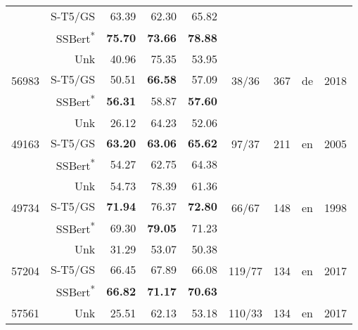 \documentclass[11pt]{article}
\begin{document}
\begin{table*}[]
\begin{tabular}{l|r|r|r|r|c|c|c|c}
     &    S-T5/GS & 63.39 & 62.30 & 65.82 &        &     &                   &   \\
     &    SSBert\textsuperscript{*} & \textbf{75.70} & \textbf{73.66} & \textbf{78.88}        &     &         &           &   \\
    \hline
    \multirow{3}{3em}{56983} &    Unk & 40.96 & 75.35 & 53.95 &       \multirow{3}{4em}{38/36} &    \multirow{3}{1em}{367} &        \multirow{3}{1em}{de} &            \multirow{3}{2em}{2018} \\
     &    S-T5/GS & 50.51 & \textbf{66.58} & 57.09 &        &     &         &             \\
     &    SSBert\textsuperscript{*} & \textbf{56.31} & 58.87 & \textbf{57.60} &        &     &         &             \\
    \hline
    \multirow{3}{3em}{49163} &    Unk & 26.12 & 64.23 & 52.06 &      \multirow{3}{4em}{97/37} &    \multirow{3}{1em}{211} &        \multirow{3}{1em}{en} &            \multirow{3}{2em}{2005} \\
     &    S-T5/GS & \textbf{63.20} & \textbf{63.06} & \textbf{65.62} &       &     &         &             \\
     &    SSBert\textsuperscript{*} & 54.27 & 62.75 & 64.38 &       &     &         &             \\
    \hline
    \multirow{3}{3em}{49734} &    Unk & 54.73 & 78.39 & 61.36 &      \multirow{3}{4em}{66/67} &    \multirow{3}{1em}{148} &        \multirow{3}{1em}{en} &            \multirow{3}{2em}{1998} \\
     &    S-T5/GS & \textbf{71.94} & 76.37 & \textbf{72.80} &       &     &         &             \\
     &    SSBert\textsuperscript{*} & 69.30 & \textbf{79.05} & 71.23 &       &     &         &             \\
    \hline
    \multirow{3}{3em}{57204} &    Unk & 31.29 & 53.07 & 50.38 &      \multirow{3}{4em}{119/77} &    \multirow{3}{1em}{134} &        \multirow{3}{1em}{en} &           \multirow{3}{2em}{2017} \\
     &    S-T5/GS & 66.45 & 67.89 & 66.08 &       &     &         &             \\
     &    SSBert\textsuperscript{*} & \textbf{66.82} & \textbf{71.17} & \textbf{70.63} &       &     &         &             \\
    \hline
    \multirow{3}{3em}{57561} &    Unk & 25.51 & 62.13 & 53.18 &      \multirow{3}{4em}{110/33} &    \multirow{3}{1em}{134} &        \multirow{3}{1em}{en} &            \multirow{3}{2em}{2017} \\

\end{tabular}
\end{table*}
\end{document}
